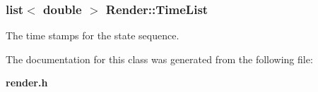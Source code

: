 \subsubsection{\setlength{\rightskip}{0pt plus 5cm}list$<$ double $>$ Render::Time\-List\hspace{0.3cm}{\tt  [protected]}}\label{class_Render_n2}


The time stamps for the state sequence.



The documentation for this class was generated from the following file:\begin{CompactItemize}
\item 
{\bf render.h}\end{CompactItemize}
